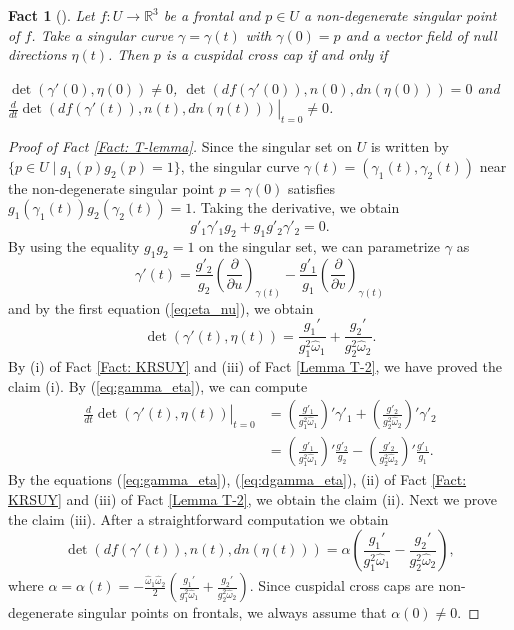\documentclass[11pt,reqno]{amsart}
\theoremstyle{plain} %
\newtheorem{fact}[theorem]{Fact}
\theoremstyle{definition}
\begin{document}
\begin{fact}[\cite{FSUY}]\label{Fact: FSUY}
Let $f: U \longrightarrow \mathbb{R}^3$ be a frontal and $p\in U$ a non-degenerate singular point of $f$. Take a singular curve $\gamma=\gamma(t)$ with $\gamma(0)=p$ and a vector field of null directions $\eta(t)$. Then $p$ is a cuspidal cross cap if and only if \begin{center}$\det\left(\gamma'(0), \eta(0)\right)\neq0$, $\det\left(df(\gamma'(0)), n(0), dn(\eta(0))\right)=0$ and $\left.\frac{d}{dt}\det\left(df(\gamma'(t)), n(t), dn(\eta(t))\right)\right|_{t=0}\neq0$.\end{center}
\end{fact}

\begin{proof}[Proof of Fact \ref{Fact: T-lemma}] 
Since the singular set on $U$ is written by $\{p\in U\mid g_1(p)g_2(p)=1\}$, the singular curve $\gamma(t)=(\gamma_1(t), \gamma_2(t))$ near the non-degenerate singular point $p=\gamma(0)$ satisfies $g_1(\gamma_1(t))g_2(\gamma_2(t))=1$. Taking the derivative, we obtain
\begin{equation*}
g'_1\gamma'_1g_2+g_1g'_2\gamma'_2=0.
\end{equation*}
By using the equality $g_1g_2=1$ on the singular set, we can parametrize $\gamma$ as
\begin{equation*}
\gamma'(t)=\frac{g'_2}{g_2}\left(\frac{\partial}{\partial u}\right)_{\gamma(t)}-\frac{g'_1}{g_1}\left(\frac{\partial}{\partial v}\right)_{\gamma(t)}
\end{equation*}
and by the first equation (\ref{eq:eta_nu}), we obtain
\begin{equation}\label{eq:gamma_eta}
\det(\gamma'(t), \eta(t))=\frac{g_1'}{g_1^2\hat{\omega}_1}+\frac{g_2'}{g_2^2\hat{\omega}_2}. 
\end{equation}
By (i) of Fact \ref{Fact: KRSUY} and (iii) of Fact \ref{Lemma T-2}, we have proved the claim (i). By (\ref{eq:gamma_eta}), we can compute
\begin{align}\label{eq:dgamma_eta}
\left.\frac{d}{dt}\det\left(\gamma'(t), \eta(t)\right)\right|_{t=0}&=\left(\frac{g'_1}{g^2_1\hat{\omega}_1}\right)'\gamma'_1+\left(\frac{g'_2}{g^2_2\hat{\omega}_2}\right)'\gamma'_2\nonumber \\ 
&=\left(\frac{g'_1}{g^2_1\hat{\omega}_1}\right)'\frac{g'_2}{g_2}-\left(\frac{g'_2}{g^2_2\hat{\omega}_2}\right)'\frac{g'_1}{g_1}. 
\end{align}
By the equations (\ref{eq:gamma_eta}), (\ref{eq:dgamma_eta}), (ii) of Fact \ref{Fact: KRSUY} and (iii) of Fact \ref{Lemma T-2}, we obtain the claim (ii). Next we prove the claim (iii). After a straightforward computation we obtain 
\begin{equation}\label{eq:det_gamma_n_dn}
\det \left(df(\gamma'(t)), n(t),dn(\eta(t))\right)=\alpha \left(\frac{g_1'}{g_1^2\hat{\omega}_1}-\frac{g_2'}{g_2^2\hat{\omega}_2}\right),
\end{equation}
where $\alpha=\alpha(t)=-\frac{\hat{\omega}_1\hat{\omega}_2}{2}\left(\frac{g_1'}{g_1^2\hat{\omega}_1}+\frac{g_2'}{g_2^2\hat{\omega}_2}\right)$. Since cuspidal cross caps are non-degenerate singular points on frontals, we always assume that $\alpha(0)\neq0$.


\end{proof}
\end{document}
